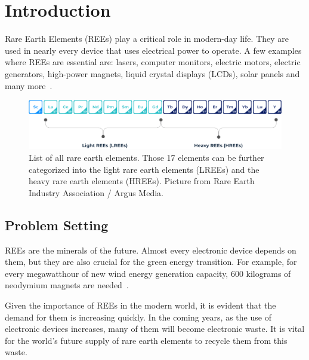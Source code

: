 \chapter{Introduction}

Rare Earth Elements (REEs) play a critical role in modern-day life.
They are used in nearly every device that uses electrical power to operate.
A few examples where REEs are essential are: lasers, computer monitors, electric motors, electric generators, high-power magnets, liquid crystal displays (LCDs), solar panels and many more~\cite{usageofrees}.

\begin{figure}[H]
    \centering
    \includegraphics[width=1\textwidth]{./media/images/rees_periodic_table}
    \caption{List of all rare earth elements. Those 17 elements can be further categorized into the light rare earth elements (LREEs) and the heavy rare earth elements (HREEs). Picture from Rare Earth Industry Association / Argus Media.}
    \label{fig:list_rees}
\end{figure}


\section{Problem Setting\authorA{}}

REEs are the minerals of the future.
Almost every electronic device depends on them, but they are also crucial for the green energy transition.
For example, for every megawatthour of new wind energy generation capacity, 600 kilograms of neodymium magnets are needed~\cite{recyclingcurrent}.

Given the importance of REEs in the modern world, it is evident that the demand for them is increasing quickly.
In the coming years, as the use of electronic devices increases, many of them will become electronic waste.
It is vital for the world's future supply of rare earth elements to recycle them from this waste.


